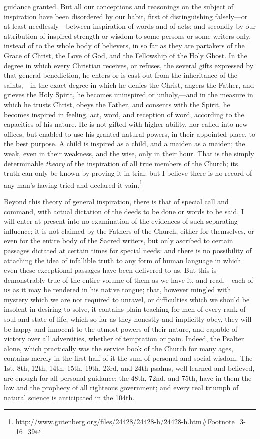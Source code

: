 \begin{quotationx}
guidance granted. But all our conceptions and reasonings on the subject of inspiration have been disordered by our habit, first of distinguishing falsely---or at least needlessly---between inspiration of words and of acts; and secondly by our attribution of inspired strength or wisdom to some persons or some writers only, instead of to the whole body of believers, in so far as they are partakers of the Grace of Christ, the Love of God, and the Fellowship of the Holy Ghost. In the degree in which every Christian receives, or refuses, the several gifts expressed by that general benediction, he enters or is cast out from the inheritance of the saints,---in the exact degree in which he denies the Christ, angers the Father, and grieves the Holy Spirit, he becomes uninspired or unholy,---and in the measure in which he trusts Christ, obeys the Father, and consents with the Spirit, he becomes inspired in feeling, act, word, and reception of word, according to the capacities of his nature. He is not gifted with higher ability, nor called into new offices, but enabled to use his granted natural powers, in their appointed place, to the best purpose. A child is inspired as a child, and a maiden as a maiden; the weak, even in their weakness, and the wise, only in their hour. That is the simply determinable \emph{theory} of the inspiration of all true members of the Church; its truth can only be known by proving it in trial: but I believe there is no record of any man's having tried and declared it vain.\footnote{\url{http://www.gutenberg.org/files/24428/24428-h/24428-h.htm\#Footnote\_3-16\_39}}

Beyond this theory of general inspiration, there is that of special call and command, with actual dictation of the deeds to be done or words to be said. I will enter at present into no examination of the evidences of such separating influence; it is not claimed by the Fathers of the Church, either for themselves, or even for the entire body of the Sacred writers, but only ascribed to certain passages dictated at certain times for special needs: and there is no possibility of attaching the idea of infallible truth to any form of human language in which even these exceptional passages have been delivered to us. But this is demonstrably true of the entire volume of them as we have it, and read,---each of us as it may be rendered in his native tongue; that, however mingled with mystery which we are not required to unravel, or difficulties which we should be insolent in desiring to solve, it contains plain teaching for men of every rank of soul and state of life, which so far as they honestly and implicitly obey, they will be happy and innocent to the utmost powers of their nature, and capable of victory over all adversities, whether of temptation or pain. Indeed, the Psalter alone, which practically was the service book of the Church for many ages, contains merely in the first half of it the sum of personal and social wisdom. The 1st, 8th, 12th, 14th, 15th, 19th, 23rd, and 24th psalms, well learned and believed, are enough for all personal guidance; the 48th, 72nd, and 75th, have in them the law and the prophecy of all righteous government; and every real triumph of natural science is anticipated in the 104th.
\end{quotationx}
